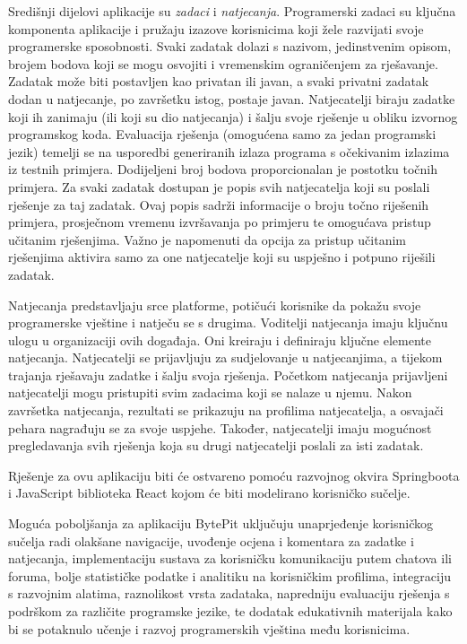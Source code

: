		Središnji dijelovi aplikacije su \emph{zadaci} i \emph{natjecanja}. Programerski zadaci su ključna komponenta aplikacije i pružaju izazove korisnicima koji žele razvijati svoje programerske sposobnosti. Svaki zadatak dolazi s nazivom, jedinstvenim opisom, brojem bodova koji se mogu osvojiti i vremenskim ograničenjem za rješavanje. Zadatak može biti postavljen kao privatan ili javan, a svaki privatni zadatak dodan u natjecanje, po završetku istog, postaje javan. Natjecatelji biraju zadatke koji ih zanimaju (ili koji su dio natjecanja) i šalju svoje rješenje u obliku izvornog programskog koda. Evaluacija rješenja (omogućena samo za jedan programski jezik) temelji se na usporedbi generiranih izlaza programa s očekivanim izlazima iz testnih primjera. Dodijeljeni broj bodova proporcionalan je postotku točnih primjera. Za svaki zadatak dostupan je popis svih natjecatelja koji su poslali rješenje za taj zadatak. Ovaj popis sadrži informacije o broju točno riješenih primjera, prosječnom vremenu izvršavanja po primjeru te omogućava pristup učitanim rješenjima. Važno je napomenuti da opcija za pristup učitanim rješenjima aktivira samo za one natjecatelje koji su uspješno i potpuno riješili zadatak.
		
		Natjecanja predstavljaju srce platforme, potičući korisnike da pokažu svoje programerske vještine i natječu se s drugima. Voditelji natjecanja imaju ključnu ulogu u organizaciji ovih događaja. Oni kreiraju i definiraju ključne elemente natjecanja. Natjecatelji se prijavljuju za sudjelovanje u natjecanjima, a tijekom trajanja rješavaju zadatke i šalju svoja rješenja. Početkom natjecanja prijavljeni natjecatelji mogu pristupiti svim zadacima koji se nalaze u njemu. Nakon završetka natjecanja, rezultati se prikazuju na profilima natjecatelja, a osvajači pehara nagrađuju se za svoje uspjehe. Također, natjecatelji imaju mogućnost pregledavanja svih rješenja koja su drugi natjecatelji poslali za isti zadatak.
		
		Rješenje za ovu aplikaciju biti će ostvareno pomoću razvojnog okvira Springboota i JavaScript biblioteka React kojom će biti modelirano korisničko sučelje.
		
		Moguća poboljšanja za aplikaciju BytePit uključuju unaprjeđenje korisničkog sučelja radi olakšane navigacije, uvođenje ocjena i komentara za zadatke i natjecanja, implementaciju sustava za korisničku komunikaciju putem chatova ili foruma, bolje statističke podatke i analitiku na korisničkim profilima, integraciju s razvojnim alatima, raznolikost vrsta zadataka, napredniju evaluaciju rješenja s podrškom za različite programske jezike, te dodatak edukativnih materijala kako bi se potaknulo učenje i razvoj programerskih vještina među korisnicima. 
		
